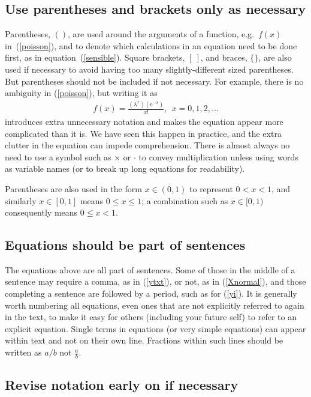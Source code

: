 \documentclass[12pt]{article}
\newcommand{\eb}{\begin{eqnarray}}
\newcommand{\ee}{\end{eqnarray}}
\begin{document}
\subsection*{Use parentheses and brackets only as necessary}

Parentheses, $()$,
are used
around the arguments of a function, e.g.~$f(x)$ in~(\ref{poisson}), and
to denote which calculations in an equation need to be done first, as
in equation~(\ref{sensible}). Square brackets, $[~]$, and braces, $\{\}$,
are also used if necessary to avoid having too many slightly-different sized
parentheses. But parentheses should not be included if not necessary. 
For example, there is no ambiguity in (\ref{poisson}), but writing it as
\eb
f(x) = \frac{\left(\lambda^x\right) \left(\mbox{e}^{-\lambda}\right)}{x!},
  ~~ x = 0, 1, 2, ...
\label{poisson2}
\ee
introduces extra unnecessary notation and makes the equation appear more 
complicated than it is. We have seen this happen in practice, and the extra
clutter in the equation can impede comprehension. There is almost always
no need to use a symbol such as $\times$ or $\cdot$
to convey multiplication unless using
words as variable names (or to break up long equations for readability).

Parentheses are also used in the form $x \in (0, 1)$ to represent $0 < x < 1$,
and similarly $x \in [0, 1]$ means $0 \leq x \leq 1$; a combination such as
$x \in [0, 1)$ consequently means $0 \leq x < 1$.

\subsection*{Equations should be part of sentences}

The equations above are all part of sentences. Some of those in the middle of 
a sentence may require a comma, as in (\ref{ytxt}), or not, as in
(\ref{Xnormal}), and those completing a sentence are followed by a period,
such as for (\ref{yi}). It is generally worth numbering all equations,
even ones that are not explicitly referred to again in the text, to make it easy
for others (including your future self) to refer to an explicit equation.
Single terms in equations (or very simple equations) can appear within 
text and not on their own line. Fractions within such lines should be
written as $a/b$ not $\frac{a}{b}$.

\subsection*{Revise notation early on if necessary}
\end{document}
